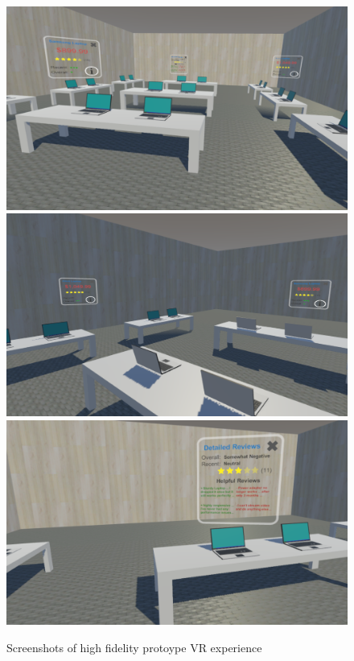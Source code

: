 \begin{figure}
	\includegraphics[width=0.9\columnwidth]{figures/3Panel}
	\includegraphics[width=0.9\columnwidth]{figures/2Panel}
	\includegraphics[width=0.9\columnwidth]{figures/DetailReviews}
	\caption{Screenshots of high fidelity protoype VR experience}
	\label{figures:HiFiScreenshots}
\end{figure}

